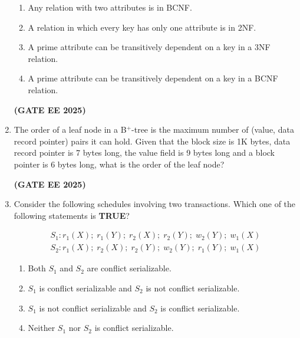 \documentclass[journal,12pt,onecolumn]{IEEEtran}
\theoremstyle{remark}
\begin{document}
\begin{enumerate}
\begin{enumerate}
\item Any relation with two attributes is in BCNF. 
\item A relation in which every key has only one attribute is in 2NF.
\item A prime attribute can be transitively dependent on a key in a 3NF relation. 
\item A prime attribute can be transitively dependent on a key in a BCNF relation.

\end{enumerate}

\hfill \textbf{(GATE EE 2025)}
\item The order of a leaf node in a B$^+$-tree is the maximum number of (value, data record pointer) pairs it can hold. Given that the block size is 1K bytes, data record pointer is 7 bytes long, the value field is 9 bytes long and a block pointer is 6 bytes long, what is the order of the leaf node?

\begin{enumerate}
\end{enumerate}
\hfill \textbf{(GATE EE 2025)}
\item Consider the following schedules involving two transactions. Which one of the following statements is \textbf{TRUE}?


\begin{align}
S_1: r_1(X); \; r_1(Y); \; r_2(X); \; r_2(Y); \; w_2(Y); \; w_1(X) \\
S_2: r_1(X); \; r_2(X); \; r_2(Y); \; w_2(Y); \; r_1(Y); \; w_1(X) 
 \end{align}
\begin{enumerate}
 \item Both $S_1$ and $S_2$ are conflict serializable. 
\item  $S_1$ is conflict serializable and $S_2$ is not conflict serializable. 
\item  $S_1$ is not conflict serializable and $S_2$ is conflict serializable. 
\item  Neither $S_1$ nor $S_2$ is conflict serializable.

\end{enumerate}


\end{enumerate}
\end{document}
